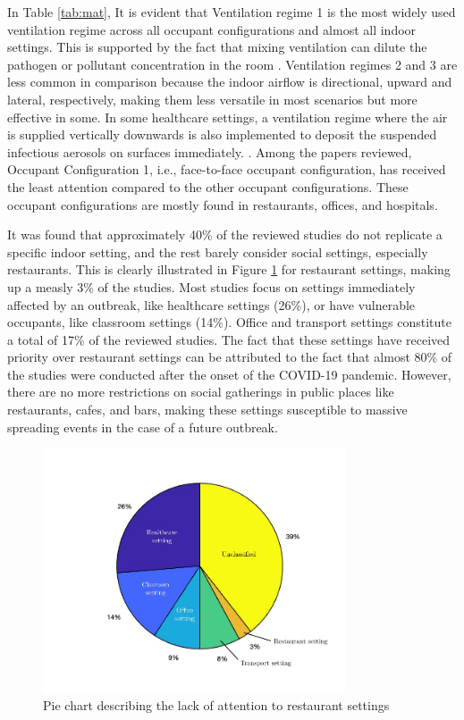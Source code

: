 \documentclass[a4paper,12pt]{elsarticle}
\begin{document}
In Table \ref{tab:mat}, It is evident that Ventilation regime 1 is the most widely used ventilation regime across all occupant configurations and almost all indoor settings. This is supported by the fact that mixing ventilation can dilute the pathogen or pollutant concentration in the room \cite{srivastava2021effective}. Ventilation regimes 2 and 3 are less common in comparison because the indoor airflow is directional, upward and lateral, respectively, making them less versatile in most scenarios but more effective in some. In some healthcare settings, a ventilation regime where the air is supplied vertically downwards is also implemented to deposit the suspended infectious aerosols on surfaces immediately. \cite{lu2022ventilation,lu2020reducing, liu2020full}. Among the papers reviewed, Occupant Configuration 1, i.e., face-to-face occupant configuration, has received the least attention compared to the other occupant configurations. These occupant configurations are mostly found in restaurants, offices, and hospitals.

It was found that approximately 40\% of the reviewed studies do not replicate a specific indoor setting, and the rest barely consider social settings, especially restaurants. This is clearly illustrated in Figure \ref{fig:pie} for restaurant settings, making up a measly 3\% of the studies. Most studies focus on settings immediately affected by an outbreak, like healthcare settings (26\%), or have vulnerable occupants, like classroom settings (14\%). Office and transport settings constitute a total of 17\% of the reviewed studies. The fact that these settings have received priority over restaurant settings can be attributed to the fact that almost 80\% of the studies were conducted after the onset of the COVID-19 pandemic. However, there are no more restrictions on social gatherings in public places like restaurants, cafes, and bars, making these settings susceptible to massive spreading events in the case of a future outbreak.

\begin{figure}[ht]
    \centering
    \includegraphics[width=0.8\textwidth]{figures/pie.jpg}
    \caption{Pie chart describing the lack of attention to restaurant settings}
    \label{fig:pie}
\end{figure}
\end{document}
